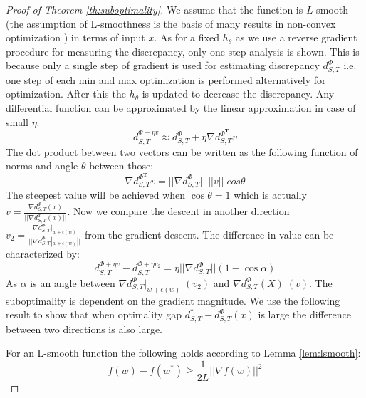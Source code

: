 \documentclass[table,dvipsnames]{article}
\theoremstyle{plain}
\theoremstyle{definition}
\theoremstyle{remark}
\begin{document}
\begin{proof}[Proof of Theorem \ref{th:suboptimality}]
We assume that the function is $L$-smooth (the assumption of L-smoothness is the basis of many results in non-convex optimization \citep{carmon2020lower}) in terms of input $x$. As for a fixed $h_{\theta}$ as we use a reverse gradient procedure for measuring the discrepancy, only one step analysis is shown. This is because only a single step of gradient is used for estimating discrepancy $d^{\Phi}_{S,T}$ i.e. one step of each min and max optimization is performed alternatively for optimization. After this the $h_{\theta}$ is updated to decrease the discrepancy. Any differential function can be approximated by the linear approximation in case of small $\eta$:
\begin{equation}
    d^{\Phi + \eta v}_{S,T} \approx d^{\Phi}_{S,T} + \eta \nabla {{d^{\Phi^{\mathbf{T}}}_{S,T}}}v
\end{equation}
The dot product between two vectors can be written as the following function of norms and angle $\theta$ between those:
\begin{equation}
    \nabla d^{\Phi^{\mathbf{T}}}_{S,T}v = || \nabla d^{\Phi}_{S,T} || \; ||v|| \; cos \theta 
\end{equation}
The steepest value will be achieved when $\cos \theta = 1$ which is actually $v =  \frac{\nabla d^{\Phi}_{S,T}(x)}{||\nabla d^{\Phi}_{S,T}(x)||}$. Now we compare the descent in another direction $v_2 = \frac{\nabla d^{\Phi}_{S,T}|_{w + \epsilon(w)}}{||\nabla d^{\Phi}_{S,T}|_{w + \epsilon(w)}||}$ from the gradient descent. The difference in value can be characterized by:
\begin{equation}
     d^{\Phi + \eta v}_{S,T} - d^{\Phi + \eta v_2}_{S,T}= \eta ||\nabla d^{\Phi}_{S,T}||(1 - \cos \alpha) 
\end{equation}
As $\alpha$ is an angle between $\nabla d^{\Phi}_{S,T}|_{w + \epsilon(w)} \; (v_2)$ and $\nabla d^{\Phi}_{S,T}(X) \; (v)$. The suboptimality is dependent on the gradient magnitude. We use the following result to show that when optimality gap $ d^{*}_{S,T} - d^{\Phi}_{S,T}(x)$ is large the difference between two directions is also large.

For an L-smooth function  the following holds according to Lemma \ref{lem:lsmooth}:
$$
f(w) - f(w^*) \geq \frac{1}{2L}  || \nabla f(w) ||^2
$$


\end{proof}
\end{document}
